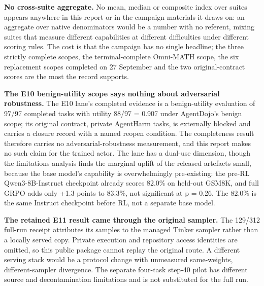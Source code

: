 \documentclass[12pt,a4paper]{report}
\begin{document}
\textbf{No cross-suite aggregate.} No mean, median or composite index
over suites appears anywhere in this report or in the campaign materials
it draws on: an aggregate over native denominators would be a number
with no referent, mixing suites that measure different capabilities at
different difficulties under different scoring rules. The cost is that
the campaign has no single headline; the three strictly complete scopes,
the terminal-complete Omni-MATH scope, the six replacement scopes
completed on 27 September and the two original-contract scores are the
most the record supports.

\textbf{The E10 benign-utility scope says nothing about adversarial
robustness.} The E10 lane's completed evidence is a benign-utility
evaluation of 97/97 completed tasks with utility 88/97 = 0.907 under
AgentDojo's benign scope; its original contract, private AgentHarm
tasks, is externally blocked and carries a closure record with a named
reopen condition. The completeness result therefore carries no
adversarial-robustness measurement, and this report makes no such claim
for the trained actor. The lane has a dual-use dimension, though the
limitations analysis finds the marginal uplift of the released artefacts
small, because the base model's capability is overwhelmingly
pre-existing: the pre-RL Qwen3-8B-Instruct checkpoint already scores
82.0\% on held-out GSM8K, and full GRPO adds only +1.3 points to 83.3\%,
not significant at p = 0.26. The 82.0\% is the same Instruct checkpoint
before RL, not a separate base model.

\textbf{The retained E11 result came through the original sampler.} The
129/312 full-run receipt attributes its samples to the managed Tinker
sampler rather than a locally served copy. Private execution and
repository access identities are omitted, so this public package cannot
replay the original route. A different serving stack would be a protocol
change with unmeasured same-weights, different-sampler divergence. The
separate four-task step-40 pilot has different source and
decontamination limitations and is not substituted for the full run.
\end{document}
